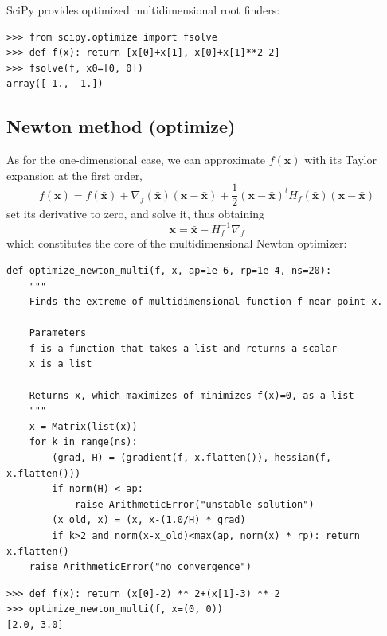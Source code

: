\documentclass[justified, sixbynine]{tufte-book}
\def\ft{\small\tt}
\theoremstyle{plain}%
\newtheorem * {corollary}{Corollary}
\theoremstyle{definition}
\theoremstyle{remark}
\newtheorem * {remark}{Remark}
\newtheorem * {note}{Note}
\begin{document}
\begin{fullwidth}
SciPy provides optimized multidimensional root finders:

\begin{lstlisting}
>>> from scipy.optimize import fsolve
>>> def f(x): return [x[0]+x[1], x[0]+x[1]**2-2]
>>> fsolve(f, x0=[0, 0])
array([ 1., -1.])
\end{lstlisting}

\goodbreak\subsection{Newton method (optimize)}


As for the one-dimensional case, we can approximate $f(\mathbf{x})$ with its Taylor expansion at the first order, 
\begin{equation}
f(\mathbf{x}) = f(\mathbf{\bar x}) + \nabla_f(\mathbf{\bar x})(\mathbf{x}-\mathbf{\bar x}) +
\frac12 (\mathbf{x}-\mathbf{\bar x})^t H_f(\mathbf{\bar x})(\mathbf{x}-\mathbf{\bar x})
\end{equation}
set its derivative to zero, and solve it, thus obtaining
\begin{equation}
\mathbf{x} = \mathbf{\bar x} - H^{-1}_f \nabla_f
\end{equation}
which constitutes the core of the multidimensional Newton optimizer:

\begin{lstlisting}[caption={in file: {\ft nlib.py}}]
def optimize_newton_multi(f, x, ap=1e-6, rp=1e-4, ns=20):
    """
    Finds the extreme of multidimensional function f near point x.

    Parameters
    f is a function that takes a list and returns a scalar
    x is a list

    Returns x, which maximizes of minimizes f(x)=0, as a list
    """
    x = Matrix(list(x))
    for k in range(ns):
        (grad, H) = (gradient(f, x.flatten()), hessian(f, x.flatten()))
        if norm(H) < ap:
            raise ArithmeticError("unstable solution")
        (x_old, x) = (x, x-(1.0/H) * grad)
        if k>2 and norm(x-x_old)<max(ap, norm(x) * rp): return x.flatten()
    raise ArithmeticError("no convergence")
\end{lstlisting}

\begin{lstlisting}[caption={in file: {\ft nlib.py}}]
>>> def f(x): return (x[0]-2) ** 2+(x[1]-3) ** 2
>>> optimize_newton_multi(f, x=(0, 0))
[2.0, 3.0]
\end{lstlisting}


\end{fullwidth}
\end{document}
